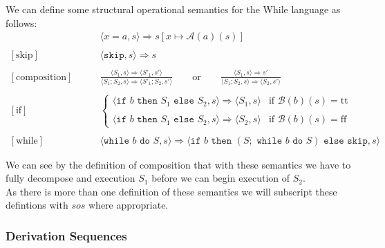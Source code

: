 \documentclass[a4paper, 12pt, twoside]{article}
\begin{document}
\newpage

We can define some structural operational semantics for the While 
language as follows:
\begin{align*}
  [\text{assignment}]& \qquad \langle x=a, s \rangle \Rightarrow s[x\mapsto \mathcal{A}(a)(s)] \\ \\
  [\text{skip}]& \qquad \langle \texttt{skip}, s \rangle \Rightarrow s \\ \\
  [\text{composition}]& \qquad \frac{
    \langle S_1, s \rangle \Rightarrow \langle S'_1, s' \rangle
  }{\langle S_1;S_2, s \rangle \Rightarrow \langle S'_1;S_2, s' \rangle} 
  \qquad \text{or} \qquad \frac{
    \langle S_1, s \rangle \Rightarrow s'
  }{\langle S_1;S_2, s \rangle \Rightarrow \langle S_2, s' \rangle} \\ \\
  [\text{if}]& \qquad \begin{cases}
    \langle \texttt{if } b \texttt{ then } S_1 \texttt{ else } S_2, s \rangle \Rightarrow 
    \langle S_1, s \rangle
    & \text{if } \mathcal{B}(b)(s) = \text{tt} \\ \\
    \langle \texttt{if } b \texttt{ then } S_1 \texttt{ else } S_2, s \rangle \Rightarrow
    \langle S_2, s \rangle
    & \text{if } \mathcal{B}(b)(s) = \text{ff}
  \end{cases} \\ \\
  [\text{while}]& \qquad \langle \texttt{while } b \texttt{ do } S, s \rangle \Rightarrow
    \langle \texttt{if } b \texttt{ then } (S; \texttt{ while } b \texttt{ do } S)
    \texttt{ else skip}, s \rangle
\end{align*}

We can see by the definition of composition that with these 
semantics we have to fully decompose and execution $S_1$ before
we can begin execution of $S_2$.
\\[\baselineskip]
As there is more than one definition of these semantics
we will subscript these defintions with $sos$ where appropriate.

\subsubsection{Derivation Sequences}
\end{document}
